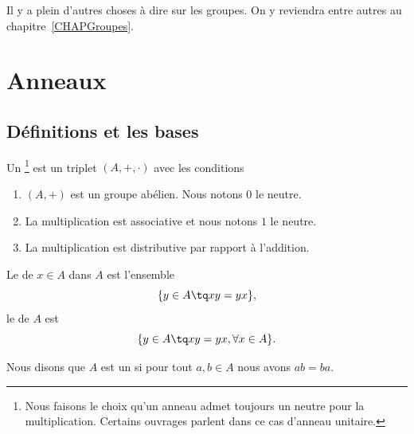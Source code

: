 Il y a plein d'autres choses à dire sur les groupes. On y reviendra entre autres au chapitre~\ref{CHAPGroupes}.

\section{Anneaux}

\subsection{Définitions et les bases}

\begin{definition}     \label{DefHXJUooKoovob}
    Un \footnote{Nous faisons le choix qu'un anneau admet toujours un neutre pour la multiplication. Certains ouvrages parlent dans ce cas d'anneau unitaire.} est un triplet \( (A,+,\cdot)\) avec les conditions
    \begin{enumerate}
        \item
            \( (A,+)\) est un groupe abélien. Nous notons \( 0\) le neutre.
        \item
            La multiplication est associative et nous notons \( 1\) le neutre.
        \item
            La multiplication est distributive par rapport à l'addition.
    \end{enumerate}
\end{definition}

\begin{definition}
    Le  de \( x\in A\) dans \( A\) est l'ensemble
    \begin{equation}
        \{ y\in A\tq xy=yx \},
    \end{equation}
    le  de \( A\) est
    \begin{equation}
        \{ y\in A\tq xy=yx,\forall x\in A \}.
    \end{equation}
\end{definition}

\begin{definition}
    Nous disons que \( A\) est un  si pour tout \( a,b\in A\) nous avons \( ab=ba\).
\end{definition}

